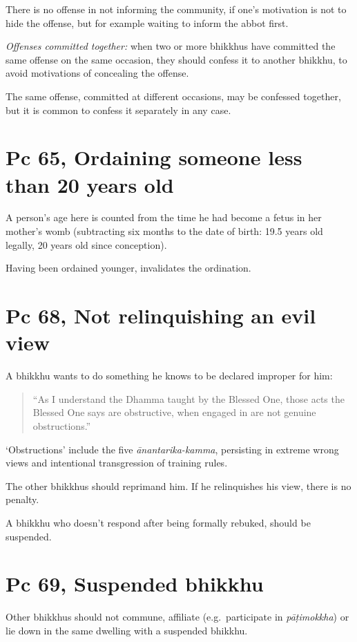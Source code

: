 There is no offense in not informing the community, if one's motivation
is not to hide the offense, but for example waiting to inform the abbot
first.

\emph{Offenses committed together:} when two or more bhikkhus have
committed the same offense on the same occasion, they should confess it
to another bhikkhu, to avoid motivations of concealing the offense.

The same offense, committed at different occasions, may be confessed
together, but it is common to confess it separately in any case.

\section{Pc 65, Ordaining someone less than 20 years old}

A person's age here is counted from the time he had become a fetus in
her mother's womb (subtracting six months to the date of birth: 19.5
years old legally, 20 years old since conception).

Having been ordained younger, invalidates the ordination.

\section{Pc 68, Not relinquishing an evil view}

A bhikkhu wants to do something he knows to be declared improper for
him:

\begin{quote}
``As I understand the Dhamma taught by the Blessed One, those acts the
Blessed One says are obstructive, when engaged in are not genuine
obstructions.''
\end{quote}

`Obstructions' include the five \emph{ānantarika-kamma}, persisting in
extreme wrong views and intentional transgression of training rules.

The other bhikkhus should reprimand him. If he relinquishes his view,
there is no penalty.

A bhikkhu who doesn't respond after being formally rebuked, should be
suspended.

\section{Pc 69, Suspended bhikkhu}

Other bhikkhus should not commune, affiliate (e.g.~participate in
\emph{pāṭimokkha}) or lie down in the same dwelling with a suspended
bhikkhu.

